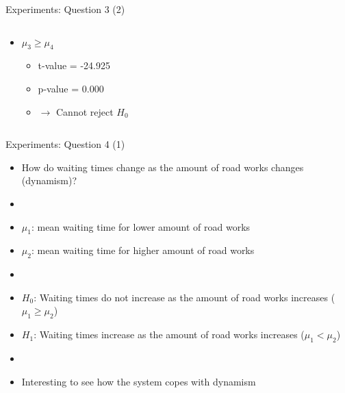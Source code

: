 \begin{frame}{Experiments: Question 3 (2)}
\begin{columns}
\begin{column}{0.5\textwidth}
\begin{itemize}
                \item $\mu_3 \geq \mu_4$
                    \begin{itemize}
                        \item t-value = -24.925
                        \item p-value = 0.000
                        \item $\rightarrow$ Cannot reject $H_0$
                    \end{itemize}
            \end{itemize}
        \end{column}

    \end{columns}
\end{frame}



\begin{frame}{Experiments: Question 4 (1)}
    \begin{itemize}
        \item How do waiting times change as the amount of road works changes (dynamism)?
        \item[]
        \item $\mu_1$: mean waiting time for lower amount of road works
        \item $\mu_2$: mean waiting time for higher amount of road works
        \item[]
        \item $H_0$: Waiting times do not increase as the amount of road works increases ($\mu_1 \geq \mu_2$)
        \item $H_1$: Waiting times increase as the amount of road works increases ($\mu_1 < \mu_2$)
        \item[]
        \item Interesting to see how the system copes with dynamism
    \end{itemize}
\end{frame}

